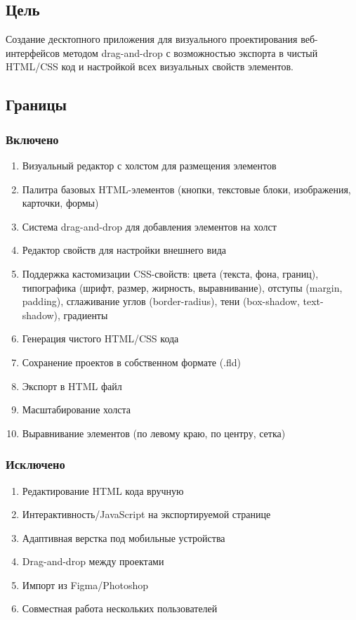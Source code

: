 \documentclass[14pt,a4paper]{extarticle}
\begin{document}
\subsection{Цель}
{

Создание десктопного приложения для визуального проектирования веб-интерфейсов методом drag-and-drop с возможностью экспорта в чистый HTML/CSS код и настройкой всех визуальных свойств элементов.


}
{\subsection{Границы}
\subsubsection{Включено}
\begin{enumerate}
    \item Визуальный редактор с холстом для размещения элементов
    \item Палитра базовых HTML-элементов (кнопки, текстовые блоки, изображения, карточки, формы)
    \item Система drag-and-drop для добавления элементов на холст
    \item Редактор свойств для настройки внешнего вида
    \item Поддержка кастомизации CSS-свойств: цвета (текста, фона, границ), типографика (шрифт, размер, жирность, выравнивание), отступы (margin, padding), сглаживание углов (border-radius), тени (box-shadow, text-shadow), градиенты
    \item Генерация чистого HTML/CSS кода
    \item Сохранение проектов в собственном формате (.fld)
    \item Экспорт в HTML файл
    \item Масштабирование холста
    \item Выравнивание элементов (по левому краю, по центру, сетка)
\end{enumerate}

\subsubsection{Исключено}

\begin{enumerate}
    \item Редактирование HTML кода вручную
    \item Интерактивность/JavaScript на экспортируемой странице
    \item Адаптивная верстка под мобильные устройства
    \item Drag-and-drop между проектами
    \item Импорт из Figma/Photoshop
    \item Совместная работа нескольких пользователей
\end{enumerate}

}
\end{document}
